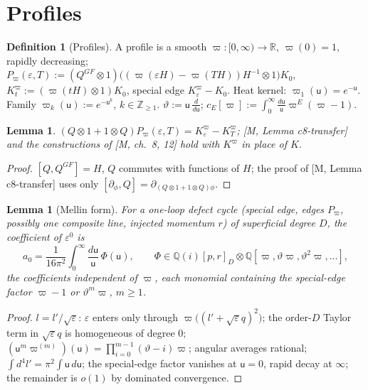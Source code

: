 \documentclass[10pt]{article}
\newtheorem{lemma}[theorem]{Lemma}
\theoremstyle{definition}
\newtheorem{definition}[theorem]{Definition}
\newcommand{\uu}{\mathsf u}
\begin{document}
\section{Profiles}

\begin{definition}[Profiles]\label{def:profile}
A profile is a smooth $\varpi:[0,\infty)\to\mathbb R$, $\varpi(0)=1$, rapidly decreasing; $P_\varpi(\varepsilon,T):=(Q^{GF}\otimes1)\big((\varpi(\varepsilon H)-\varpi(TH))H^{-1}\otimes1\big)K_0$, $K^\varpi_t:=(\varpi(tH)\otimes1)K_0$, special edge $K^\varpi_\varepsilon-K_0$. Heat kernel: $\varpi_1(\uu)=e^{-\uu}$. Family $\varpi_k(\uu):=e^{-\uu^k}$, $k\in\mathbb Z_{\ge1}$. $\vartheta:=\uu\,\tfrac{d}{d\uu}$; $c_E[\varpi]:=\int_0^\infty\frac{d\uu}{\uu}\varpi^E(\varpi-1)$.
\end{definition}

\begin{lemma}\label{lem:prof}
$(Q\otimes1+1\otimes Q)P_\varpi(\varepsilon,T)=K^\varpi_\varepsilon-K^\varpi_T$; [M, Lemma c8-transfer] and the constructions of [M, ch.~8, 12] hold with $K^\varpi$ in place of $K$.
\end{lemma}
\begin{proof}
$[Q,Q^{GF}]=H$, $Q$ commutes with functions of $H$; the proof of [M, Lemma c8-transfer] uses only $[\partial_\phi,Q]=\partial_{(Q\otimes1+1\otimes Q)\phi}$.
\end{proof}

\begin{lemma}[Mellin form]\label{lem:mellin}
For a one-loop defect cycle (special edge, edges $P_\varpi$, possibly one composite line, injected momentum $r$) of superficial degree $D$, the coefficient of $\varepsilon^0$ is
\[
a_0=\frac1{16\pi^2}\int_0^\infty\frac{d\uu}{\uu}\,\Phi(\uu),\qquad \Phi\in\mathbb Q(i)[p,r]_D\otimes\mathbb Q[\varpi,\vartheta\varpi,\vartheta^2\varpi,\dots],
\]
the coefficients independent of $\varpi$, each monomial containing the special-edge factor $\varpi-1$ or $\vartheta^m\varpi$, $m\ge1$.
\end{lemma}
\begin{proof}
$l=l'/\sqrt\varepsilon$: $\varepsilon$ enters only through $\varpi\big((l'+\sqrt\varepsilon q)^2\big)$; the order-$D$ Taylor term in $\sqrt\varepsilon q$ is homogeneous of degree $0$; $(\uu^m\varpi^{(m)})(\uu)=\prod_{i=0}^{m-1}(\vartheta-i)\varpi$; angular averages rational; $\int d^4l'=\pi^2\int\uu\,d\uu$; the special-edge factor vanishes at $\uu=0$, rapid decay at $\infty$; the remainder is $o(1)$ by dominated convergence.
\end{proof}
\end{document}
